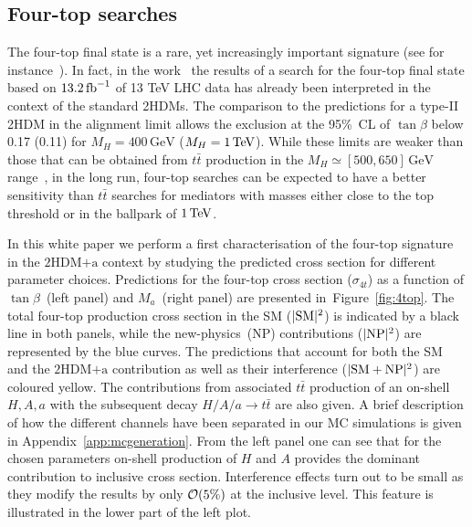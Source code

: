 \documentclass[review]{elsarticle}
\newcommand{\ma}{\ensuremath{M_{a}}\xspace}
\newcommand{\mH}{\ensuremath{M_{H}}\xspace}
\newcommand{\hdma}{\ensuremath{\textrm{2HDM+a}}\xspace}
\begin{document}
\subsection{Four-top searches}
\label{sec:fourtopmain}

The four-top final state is a rare, yet increasingly important signature (see for instance~\cite{ATLAS-CONF-2016-104,Sirunyan:2017roi,Aaboud:2018xuw,Hajer:2015gka,Gori:2016zto,Alvarez:2016nrz}).   In fact, in the work~\cite{ATLAS-CONF-2016-104} the results of a search for the four-top final state based on $13.2 \, {\rm fb}^{-1}$ of 13 TeV LHC data has already been interpreted in the context of the standard 2HDMs. The comparison to the predictions for a type-II 2HDM in the alignment limit allows the exclusion at the 95\%~CL of $\tan \beta$  below 0.17 (0.11) for $\mH = 400 \, {\mathrm{GeV}}$ ($\mH = 1 \, {\rm TeV}$). While these limits are weaker than those that can be obtained from $t \bar t$ production in the $M_{H} \simeq [500, 650] \, {\mathrm{GeV}}$ range~\cite{Aaboud:2017hnm}, in the long run, four-top searches can be expected to have a better sensitivity than $t \bar t$ searches for mediators with  masses either close to the top threshold or  in the ballpark of $1 \, {\rm TeV}$. 

 In this white paper we perform a first characterisation of the four-top signature in the \hdma context by studying the predicted cross section for different parameter choices. Predictions for the four-top cross section ($\sigma_{4t}$) as a function of $\tan \beta$~(left panel) and $\ma$~(right panel) are presented in~Figure~\ref{fig:4top}. The total four-top production cross section in the SM ($|{\rm SM}|^2$) is indicated by a black line in both panels, while the new-physics~(NP) contributions ($|{\rm NP}|^2$) are represented by the blue curves. The predictions that account for both the SM and the \hdma contribution as well as  their interference ($|{\rm SM} + {\rm NP}|^2$) are coloured yellow. The contributions from associated $t \bar t$ production of an on-shell $H, A, a$ with the subsequent decay $H/A/a \to t \bar t$ are also given.  A brief description of how the different channels have been separated in our MC simulations  is given in Appendix~\ref{app:mcgeneration}. From the left panel one can see that for the chosen parameters on-shell production of $H$ and $A$ provides the dominant contribution to inclusive cross section. Interference effects turn out to be small as they modify the results  by only ${\cal O} (5\%)$ at the inclusive level. This feature is illustrated in the lower part of the left plot.
 
\end{document}
